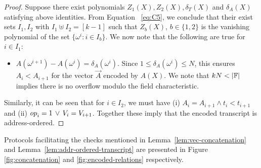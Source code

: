 \begin{proof}
    Suppose there exist polynomials $Z_1(X),Z_2(X),\delta_T(X)$ and $\delta_A(X)$ satisfying above identities. From Equation
    ~\eqref{eq:C5}, we conclude that their exist sets $I_1,I_2$ with $I_1\uplus I_2=[k-1]$ such that $Z_b(X)$, $b\in \{1,2\}$ is the
    vanishing polynomial of the set $\{\omega^i: i\in I_b\}$. We now note that the following are true for $i\in I_1$:
    \begin{itemize}[leftmargin=1em]
        \item $A(\omega^{i+1})-A(\omega^i)=\delta_A(\omega^i)$. Since $1\leq \delta_A(\omega^i)\leq N$, this ensures $A_i < A_{i+1}$ for the vector $\vec{A}$ encoded
        by $A(X)$. We note that $kN < |\mathbb{F}|$ implies there is no overflow modulo the field characteristic.
    \end{itemize}
    Similarly, it can be seen that for $i\in I_2$, we must have (i) $A_i=A_{i+1}\wedge t_i < t_{i+1}$
    and (ii) ${op}_i=1\,\vee\,V_i=V_{i+1}$. Together these imply that the encoded transcript is address-ordered.
\end{proof}

Protocols facilitating the checks mentioned in Lemma~\ref{lem:vec-concatenation} and Lemma~\ref{lem:addr-ordered-transcript} are presented in Figure \ref{fig:concatenation} and \ref{fig:encoded-relations} respectively.

